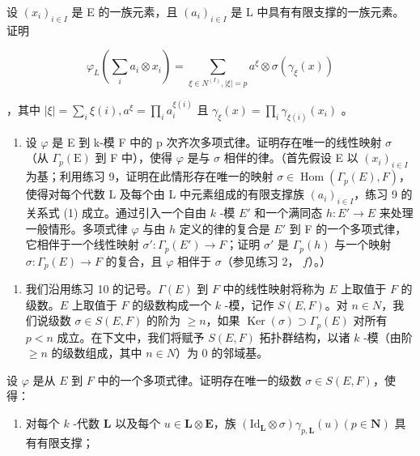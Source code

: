 设 \((x_{i})_{i\in I}\) 是 E 的一族元素，且 \((a_{i})_{i\in I}\) 是 L 中具有有限支撑的一族元素。证明

\[
\varphi_ {L} \left(\sum_ {i} a _ {i} \otimes x _ {i}\right) = \sum_ {\xi \in N ^ {(I)}, | \xi | = p} a ^ {\xi} \otimes \sigma (\gamma_ {\xi} (x))
\]

，其中 \(|\xi| = \sum_{i} \xi(i), a^{\xi} = \prod_{i} a_{i}^{\xi(i)}\) 且 \(\gamma_{\xi}(x) = \prod_{i} \gamma_{\xi(i)}(x_{i})\) 。

\begin{enumerate}
\def\labelenumi{\alph{enumi})}
\setcounter{enumi}{1}
\tightlist
\item
  设 \(\varphi\) 是 E 到 k-模 F 中的 p 次齐次多项式律。证明存在唯一的线性映射 \(\sigma\)（从 \(\Gamma_{p}(\mathrm{E})\) 到 F 中），使得 \(\varphi\) 是与 \(\sigma\) 相伴的律。（首先假设 E 以 \((x_i)_{i \in I}\) 为基；利用练习 9，证明在此情形存在唯一的映射 \(\sigma \in \operatorname{Hom}(\Gamma_p(E), F)\)，使得对每个代数 L 及每个由 L 中元素组成的有限支撑族 \((a_i)_{i \in I}\)，练习 9 的关系式 (1) 成立。通过引入一个自由 \(k\) -模 \(E'\) 和一个满同态 \(h: E' \to E\) 来处理一般情形。多项式律 \(\varphi\) 与由 \(h\) 定义的律的复合是 \(E'\) 到 F 的一个多项式律，它相伴于一个线性映射 \(\sigma': \Gamma_p(E') \to F\)；证明 \(\sigma'\) 是 \(\Gamma_p(h)\) 与一个映射 \(\sigma: \Gamma_p(E) \to F\) 的复合，且 \(\varphi\) 相伴于 \(\sigma\)（参见练习 2， \(f\)）。）
\end{enumerate}

\begin{enumerate}
\def\labelenumi{\arabic{enumi})}
\setcounter{enumi}{10}
\tightlist
\item
  我们沿用练习 10 的记号。\(\Gamma(E)\) 到 \(F\) 中的线性映射将称为 \(E\) 上取值于 \(F\) 的级数。\(E\) 上取值于 \(F\) 的级数构成一个 \(k\) -模，记作 \(S(E, F)\)。对 \(n \in N\)，我们说级数 \(\sigma \in S(E, F)\) 的阶为 \(\geqslant n\)，如果 \(\operatorname{Ker}(\sigma) \supset \Gamma_p(E)\) 对所有 \(p < n\) 成立。在下文中，我们将赋予 \(S(E, F)\) 拓扑群结构，以诸 \(k\) -模（由阶 \(\geqslant n\) 的级数组成，其中 \(n \in N\)）为 0 的邻域基。
\end{enumerate}

设 \(\varphi\) 是从 \(E\) 到 \(F\) 中的一个多项式律。证明存在唯一的级数 \(\sigma \in S(E, F)\)，使得：

\begin{enumerate}
\def\labelenumi{(\roman{enumi})}
\tightlist
\item
  对每个 \(k\) -代数 \(\mathbf{L}\) 以及每个 \(u \in \mathbf{L} \otimes \mathbf{E}\)，族 \((\mathrm{Id}_{\mathbf{L}} \otimes \sigma) \gamma_{p,\mathbf{L}}(u) (p \in \mathbf{N})\) 具有有限支撑；
\end{enumerate}

